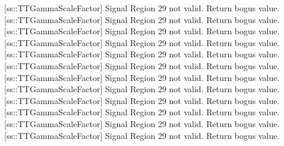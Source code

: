 [ss::TTGammaScaleFactor] Signal Region 29 not valid.  Return bogus value.
[ss::TTGammaScaleFactor] Signal Region 29 not valid.  Return bogus value.
[ss::TTGammaScaleFactor] Signal Region 29 not valid.  Return bogus value.
[ss::TTGammaScaleFactor] Signal Region 29 not valid.  Return bogus value.
[ss::TTGammaScaleFactor] Signal Region 29 not valid.  Return bogus value.
[ss::TTGammaScaleFactor] Signal Region 29 not valid.  Return bogus value.
[ss::TTGammaScaleFactor] Signal Region 29 not valid.  Return bogus value.
[ss::TTGammaScaleFactor] Signal Region 29 not valid.  Return bogus value.
[ss::TTGammaScaleFactor] Signal Region 29 not valid.  Return bogus value.
[ss::TTGammaScaleFactor] Signal Region 29 not valid.  Return bogus value.
[ss::TTGammaScaleFactor] Signal Region 29 not valid.  Return bogus value.
[ss::TTGammaScaleFactor] Signal Region 29 not valid.  Return bogus value.
